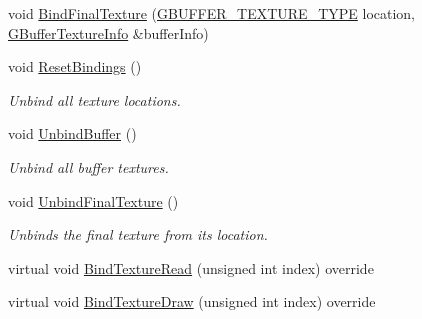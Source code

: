 \begin{DoxyCompactItemize}
\item 
void \mbox{\hyperlink{class_geometry_engine_1_1_geometry_buffer_1_1_g_buffer_a710627a05fa69f6aa98ee6d90ab57e85}{Bind\+Final\+Texture}} (\mbox{\hyperlink{class_geometry_engine_1_1_geometry_buffer_1_1_g_buffer_a718dceafcac1915f7de061108597e1cc}{G\+B\+U\+F\+F\+E\+R\+\_\+\+T\+E\+X\+T\+U\+R\+E\+\_\+\+T\+Y\+PE}} location, \mbox{\hyperlink{class_geometry_engine_1_1_g_buffer_texture_info}{G\+Buffer\+Texture\+Info}} \&buffer\+Info)
\item 
\mbox{\label{class_geometry_engine_1_1_geometry_buffer_1_1_g_buffer_a1ef28cc887dbd56d20ae4df0617b8eb1}} 
void \mbox{\hyperlink{class_geometry_engine_1_1_geometry_buffer_1_1_g_buffer_a1ef28cc887dbd56d20ae4df0617b8eb1}{Reset\+Bindings}} ()
\begin{DoxyCompactList}\small\item\em Unbind all texture locations. \end{DoxyCompactList}\item 
\mbox{\label{class_geometry_engine_1_1_geometry_buffer_1_1_g_buffer_a2c24808c13f616bcc3ca6ed321277e95}} 
void \mbox{\hyperlink{class_geometry_engine_1_1_geometry_buffer_1_1_g_buffer_a2c24808c13f616bcc3ca6ed321277e95}{Unbind\+Buffer}} ()
\begin{DoxyCompactList}\small\item\em Unbind all buffer textures. \end{DoxyCompactList}\item 
\mbox{\label{class_geometry_engine_1_1_geometry_buffer_1_1_g_buffer_a954286e665d76dc77f352923a3c0b191}} 
void \mbox{\hyperlink{class_geometry_engine_1_1_geometry_buffer_1_1_g_buffer_a954286e665d76dc77f352923a3c0b191}{Unbind\+Final\+Texture}} ()
\begin{DoxyCompactList}\small\item\em Unbinds the final texture from its location. \end{DoxyCompactList}\item 
virtual void \mbox{\hyperlink{class_geometry_engine_1_1_geometry_buffer_1_1_g_buffer_a40c1b8f341429f061a381ba98574ea82}{Bind\+Texture\+Read}} (unsigned int index) override
\item 
virtual void \mbox{\hyperlink{class_geometry_engine_1_1_geometry_buffer_1_1_g_buffer_ab14f2b1778d7415674b67c3349392cc9}{Bind\+Texture\+Draw}} (unsigned int index) override

\end{DoxyCompactItemize}
